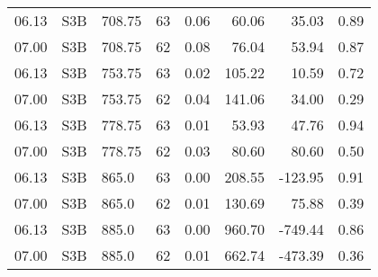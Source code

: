 \documentclass[preview]{standalone}
\begin{document}
\begin{table}
\begin{tabular}{llllrrrr}
06.13 &  S3B &  708.75 &  63 &  0.06 &   60.06 &   35.03 & 0.89 \\
07.00 &  S3B &  708.75 &  62 &  0.08 &  76.04 &   53.94 & 0.87 \\\hline
06.13 &  S3B &  753.75 &  63 &  0.02 &  105.22 &   10.59 & 0.72 \\
07.00 &  S3B &  753.75 &  62 &  0.04 & 141.06 &   34.00 & 0.29 \\\hline
06.13 &  S3B &  778.75 &  63 &  0.01 &   53.93 &   47.76 & 0.94 \\
07.00 &  S3B &  778.75 &  62 &  0.03 &  80.60 &   80.60 & 0.50 \\\hline
06.13 &  S3B &   865.0 &  63 &  0.00 &  208.55 & -123.95 & 0.91 \\
07.00 &  S3B &   865.0 &  62 &  0.01 & 130.69 &   75.88 & 0.39 \\\hline
06.13 &  S3B &   885.0 &  63 &  0.00 &  960.70 & -749.44 & 0.86 \\
07.00 &  S3B &   885.0 &  62 &  0.01 & 662.74 & -473.39 & 0.36 \\\hline
\bottomrule
\end{tabular}



\end{table}
\end{document}
